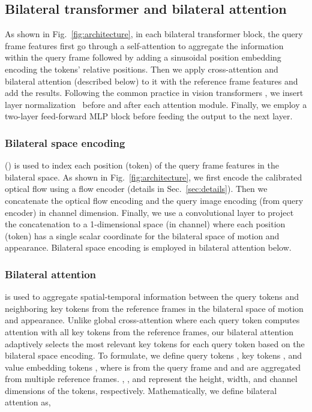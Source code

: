 \documentclass[runningheads]{llncs}
\begin{document}
\subsection{Bilateral transformer and bilateral attention}\label{sec:bilateral}
As shown in Fig.~\ref{fig:architecture}, in each bilateral transformer block, the query frame features first go through a self-attention \cite{vaswani2017attention} to aggregate the information within the query frame followed by adding a sinusoidal position embedding \cite{vaswani2017attention} encoding the tokens' relative positions. Then we apply cross-attention and bilateral attention (described below) to it with the reference frame features and add the results. Following the common practice in vision transformers \cite{AOT,TransVOS}, we insert layer normalization~\cite{ba2016layer} before and after each attention module. Finally, we employ a two-layer feed-forward MLP block before feeding the output to the next layer.

\subsubsection{Bilateral space encoding} () is used to index each position (token) of the query frame features in the bilateral space. As shown in Fig.~\ref{fig:architecture}, we first encode the calibrated optical flow using a flow encoder (details in Sec.~\ref{sec:details}). Then we concatenate the optical flow encoding and the query image encoding (from query encoder) in channel dimension. Finally, we use a  convolutional layer to project the concatenation to a 1-dimensional space (in channel) where each position (token) has a single scalar coordinate for the bilateral space of motion and appearance. Bilateral space encoding is employed in bilateral attention below.

\subsubsection{Bilateral attention} is used to aggregate spatial-temporal information between the query tokens and neighboring key tokens from the reference frames in the bilateral space of motion and appearance. Unlike global cross-attention where each query token computes attention with all key tokens from the reference frames, our bilateral attention adaptively selects the most relevant key tokens for each query token based on the bilateral space encoding. To formulate, we define query tokens , key tokens , and value embedding tokens , where  is from the query frame and  and  are aggregated from multiple reference frames. , , and  represent the height, width, and channel dimensions of the tokens, respectively. Mathematically, we define bilateral attention as,
\end{document}
